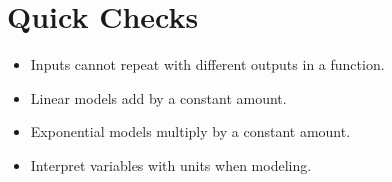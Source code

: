 \documentclass[11pt]{article}
\begin{document}
\section*{Quick Checks}
\begin{itemize}
  \item Inputs cannot repeat with different outputs in a function.
  \item Linear models add by a constant amount.
  \item Exponential models multiply by a constant amount.
  \item Interpret variables with units when modeling.
\end{itemize}
\end{document}
